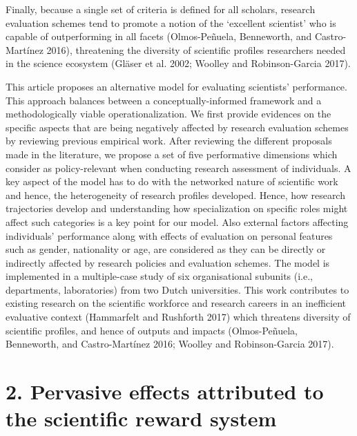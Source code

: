 \documentclass[]{elsarticle} %
\begin{document}
Finally, because a single set of criteria is defined for all scholars,
research evaluation schemes tend to promote a notion of the `excellent
scientist' who is capable of outperforming in all facets (Olmos-Peñuela,
Benneworth, and Castro-Martínez 2016), threatening the diversity of
scientific profiles researchers needed in the science ecosystem (Gläser
et al. 2002; Woolley and Robinson-Garcia 2017).

This article proposes an alternative model for evaluating scientists'
performance. This approach balances between a conceptually-informed
framework and a methodologically viable operationalization. We first
provide evidences on the specific aspects that are being negatively
affected by research evaluation schemes by reviewing previous empirical
work. After reviewing the different proposals made in the literature, we
propose a set of five performative dimensions which consider as
policy-relevant when conducting research assessment of individuals. A
key aspect of the model has to do with the networked nature of
scientific work and hence, the heterogeneity of research profiles
developed. Hence, how research trajectories develop and understanding
how specialization on specific roles might affect such categories is a
key point for our model. Also external factors affecting individuals'
performance along with effects of evaluation on personal features such
as gender, nationality or age, are considered as they can be directly or
indirectly affected by research policies and evaluation schemes. The
model is implemented in a multiple-case study of six organisational
subunits (i.e., departments, laboratories) from two Dutch universities.
This work contributes to existing research on the scientific workforce
and research careers in an inefficient evaluative context (Hammarfelt
and Rushforth 2017) which threatens diversity of scientific profiles,
and hence of outputs and impacts (Olmos-Peñuela, Benneworth, and
Castro-Martínez 2016; Woolley and Robinson-Garcia 2017).

\hypertarget{pervasive-effects-attributed-to-the-scientific-reward-system}{%
\section{2. Pervasive effects attributed to the scientific reward
system}\label{pervasive-effects-attributed-to-the-scientific-reward-system}}
\end{document}
